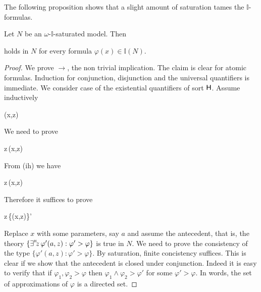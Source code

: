 \documentclass[10pt,oneside]{amsproc}
\begin{document}
The following proposition shows that a slight amount of saturation tames the $\mathds{I}$-formulas.


\begin{proposition}\label{prop_approx}
  Let $N$ be an $\omega$-$\mathds{I}$-saturated model.
  Then 
  
  
  holds in $N$ for every formula $\varphi(x)\in\mathds{I}(N)$.
\end{proposition}

\begin{proof}
  We prove $\rightarrow$, the non trivial implication.
  The claim is clear for atomic formulas.
  Induction for conjunction, disjunction and the universal quantifiers is immediate.
%
%
%
%
%
  We consider case of the existential quantifiers of sort ${\sf H}$.
  Assume inductively
  
  {\rightarrow}
  {\varphi(x,z)}

  We need to prove

  {\rightarrow}
  {\existsH z\,\varphi(x,z)}

  From (ih) we have

  {\rightarrow}
  {\existsH z\,\varphi(x,z)}

  Therefore it suffices to prove

  {\rightarrow}
  {\existsH z\,\{\varphi(x,z)\}'}

Replace $x$ with some parameters, say $a$ and assume the antecedent, that is, the theory $\{\existsH z\,\varphi'(a,z):\varphi'>\varphi\}$ is true in $N$.
We need to prove the consistency of the type $\{\varphi'(a,z):\varphi'>\varphi\}$.
By saturation, finite concistency suffices.
This is clear if we show that the antecedent is closed under conjunction.
Indeed it is easy to verify that if $\varphi_1,\varphi_2>\varphi$ then $\varphi_1\wedge\varphi_2>\varphi'$ for some $\varphi'>\varphi$.
In words, the set of approximations of $\varphi$ is a directed set.


\end{proof}
\end{document}
